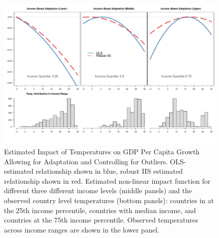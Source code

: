 \documentclass[11pt, letterpaper]{article}
\numberwithin{algorithm}{section}
\numberwithin{assumption}{section}
\numberwithin{lemma}{section}
\numberwithin{theorem}{section}
\numberwithin{corollary}{section}
\numberwithin{remark}{section}
\numberwithin{equation}{section}
\numberwithin{figure}{section}
\numberwithin{table}{section}
\begin{document}
\begin{figure}[!htbp]  %
\centering
\includegraphics[width = \textwidth]{eff.adapt.pdf}
\caption{Estimated Impact of Temperatures on GDP Per Capita Growth Allowing for Adaptation and Controlling for Outliers. OLS-estimated relationship shown in blue, robust IIS estimated relationship shown in red. Estimated non-linear impact function for different three different income levels (middle panels) and the observed country level temperatures (bottom panels): countries in at the 25th income percentile, countries with median income, and countries at the 75th income percentile. Observed temperatures across income ranges are shown in the lower panel. }
\label{fig_dist_app1}
\end{figure}
\end{document}
